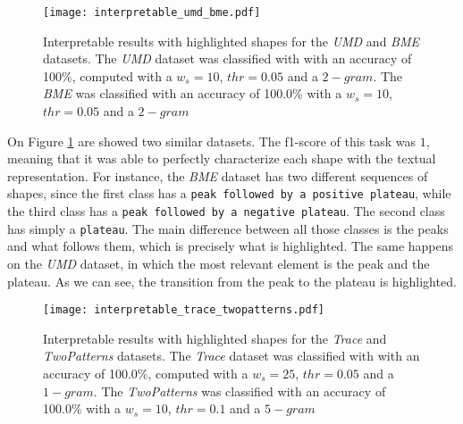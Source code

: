 \begin{figure}[h]
    \centering
    \texttt{[image: interpretable\_umd\_bme.pdf]}
    \caption{Interpretable results with highlighted shapes for the \textit{UMD} and \textit{BME} datasets. The \textit{UMD} dataset was classified with with an accuracy of 100\%, computed with a $w_s=10$, $thr=0.05$ and a $2-gram$. The \textit{BME} was classified with an accuracy of 100.0\% with a $w_s=10$, $thr=0.05$ and a $2-gram$}
    \label{fig:interpretable1}
\end{figure}

On Figure \ref{fig:interpretable1} are showed two similar datasets. The f1-score of this task was $1$, meaning that it was able to perfectly characterize each shape with the textual representation. For instance, the \textit{BME} dataset has two different sequences of shapes, since the first class has a \texttt{peak followed by a positive plateau}, while the third class has a \texttt{peak followed by a negative plateau}. The second class has simply a \texttt{plateau}. The main difference between all those classes is the peaks and what follows them, which is precisely what is highlighted. The same happens on the \textit{UMD} dataset, in which the most relevant element is the peak and the plateau. As we can see, the transition from the peak to the plateau is highlighted.

\begin{figure}[h]
    \centering
    \texttt{[image: interpretable\_trace\_twopatterns.pdf]}
    \caption{Interpretable results with highlighted shapes for the \textit{Trace} and \textit{TwoPatterns} datasets. The \textit{Trace} dataset was classified with with an accuracy of 100.0\%, computed with a $w_s=25$, $thr=0.05$ and a $1-gram$. The \textit{TwoPatterns} was classified with an accuracy of 100.0\% with a $w_s=10$, $thr=0.1$ and a $5-gram$}
    \label{fig:interpretable2}
\end{figure}

